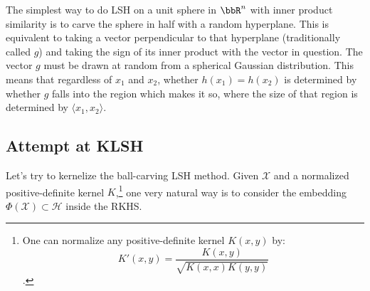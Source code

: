 \documentclass[twoside,11pt]{homework}
\begin{document}
The simplest way to do LSH on a unit sphere in $\bbR^n$ with inner
product similarity is to carve the sphere in half with a random
hyperplane.  This is equivalent to taking a vector perpendicular to
that hyperplane (traditionally called $g$) and taking the sign of its
inner product with the vector in question.  The vector $g$ must be
drawn at random from a spherical Gaussian distribution.  This means
that regardless of $x_1$ and $x_2$, whether $h(x_1)=h(x_2)$  is
determined by whether $g$ falls into the region which makes it so,
where the size of that region is determined by $\langle x_1,x_2
\rangle$.








\subsection{Attempt at KLSH} %
Let's try to kernelize the ball-carving LSH method. Given $\mathcal{X}$ and a
normalized positive-definite kernel $K$,\footnote{One can normalize any positive-definite
  kernel $K(x,y)$ by:
  \[K'(x,y) = \frac{K(x,y)}{\sqrt{K(x,x)K(y,y)}}\].}
one very natural way is to consider the embedding $\Phi(\mathcal{X}) \subset \mathcal{H}$
inside the RKHS.
\end{document}
